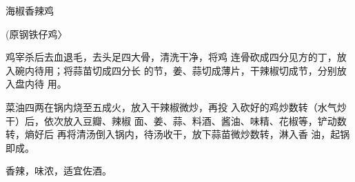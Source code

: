 \begin{recipe}{海椒香辣鸡}

(原钢铁仔鸡〉

\ingredients


\cooking

\step 	鸡宰杀后去血退毛，去头足四大骨，清洗干净，将鸡 连骨砍成四分见方的丁，放入碗内待用；将蒜苗切成四分长 的节，姜、蒜切成薄片，干辣椒切成节，分别放入盘内待 用。

\step 	菜油四两在锅内烧至五成火，放入干辣椒微炒，再投 入砍好的鸡炒数转（水气炒干）后，依次放入豆瓣、辣椒 面、姜、蒜、料酒、酱油、味精、花椒等，铲动数转，熵好后 再将清汤倒入锅内，待汤收干，放下蒜苗微炒数转，淋入香 油，起锅即成。

\notes

香辣，味浓，适宜佐酒。

\end{recipe}

